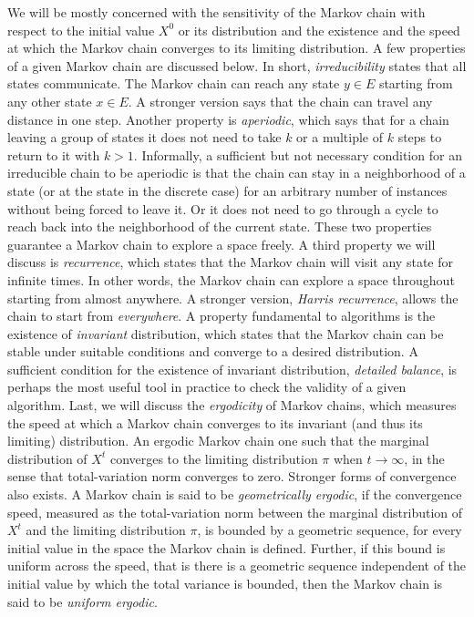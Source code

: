 We will be mostly concerned with the sensitivity of the Markov chain with respect to the initial value $X^0$ or its distribution and the existence and the speed at which the Markov chain converges to its limiting distribution. A few properties of a given Markov chain are discussed below. In short, \emph{irreducibility} states that all states communicate. The Markov chain can reach any state $y\in E$ starting from any other state $x\in E$. A stronger version says that the chain can travel any distance in one step. Another property is \emph{aperiodic}, which says that for a chain leaving a group of states it does not need to take $k$ or a multiple of $k$ steps to return to it with $k>1$. Informally, a sufficient but not necessary condition for an irreducible chain to be aperiodic is that the chain can stay in a neighborhood of a state (or at the state in the discrete case) for an arbitrary number of instances without being forced to leave it. Or it does not need to go through a cycle to reach back into the neighborhood of the current state. These two properties guarantee a Markov chain to explore a space freely. A third property we will discuss is \emph{recurrence}, which states that the Markov chain will visit any state for infinite times. In other words, the Markov chain can explore a space throughout starting from almost anywhere. A stronger version, \emph{Harris recurrence}, allows the chain to start from \emph{everywhere}. A property fundamental to \mcmc algorithms is the existence of \emph{invariant} distribution, which states that the Markov chain can be stable under suitable conditions and converge to a desired distribution. A sufficient condition for the existence of invariant distribution, \emph{detailed balance}, is perhaps the most useful tool in practice to check the validity of a given algorithm. Last, we will discuss the \emph{ergodicity} of Markov chains, which measures the speed at which a Markov chain converges to its invariant (and thus its limiting) distribution. An ergodic Markov chain one such that the marginal distribution of $X^t$ converges to the limiting distribution $\pi$ when $t\to\infty$, in the sense that total-variation norm converges to zero. Stronger forms of convergence also exists. A Markov chain is said to be \emph{geometrically ergodic}, if the convergence speed, measured as the total-variation norm between the marginal distribution of $X^t$ and the limiting distribution $\pi$, is bounded by a geometric sequence, for every initial value in the space the Markov chain is defined. Further, if this bound is uniform across the speed, that is there is a geometric sequence independent of the initial value by which the total variance is bounded, then the Markov chain is said to be \emph{uniform ergodic}.

